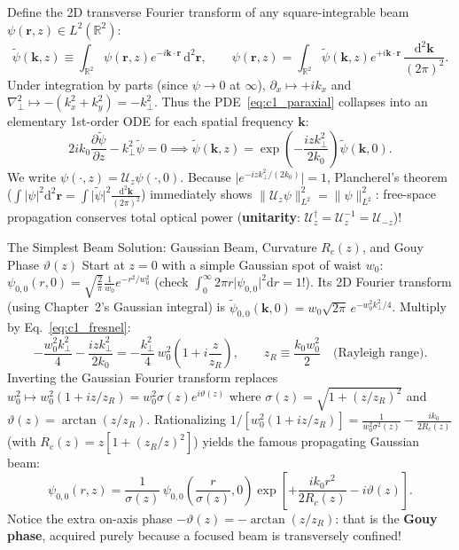 \documentclass[10pt,letterpaper]{article}
\newcommand{\norm}[1]{\lVert #1 \rVert}
\newcommand{\abs}[1]{\lvert #1 \rvert}
\newcommand{\dd}{\mathrm{d}}
\numberwithin{equation}{section}
\begin{document}
Define the 2D transverse Fourier transform of any square-integrable beam $\psi(\mathbf{r},z) \in L^2(\mathbb{R}^2)$:
\begin{equation}
  \widetilde{\psi}(\mathbf{k},z) \equiv \int_{\mathbb{R}^2} \psi(\mathbf{r},z) e^{-i\mathbf{k}\cdot\mathbf{r}}\,\dd^2\mathbf{r}, \qquad
  \psi(\mathbf{r},z) = \int_{\mathbb{R}^2} \widetilde{\psi}(\mathbf{k},z) e^{+i\mathbf{k}\cdot\mathbf{r}}\,\frac{\dd^2\mathbf{k}}{(2\pi)^2}.
  \label{eq:c1_ft}
\end{equation}
Under integration by parts (since $\psi \to 0$ at $\infty$), $\partial_x \mapsto +ik_x$ and $\nabla_\perp^2 \mapsto -(k_x^2 + k_y^2) = -k_\perp^2$. Thus the PDE~\eqref{eq:c1_paraxial} collapses into an elementary 1st-order ODE for each spatial frequency $\mathbf{k}$:
\begin{equation}
  2ik_0\frac{\partial\widetilde{\psi}}{\partial z} - k_\perp^2\widetilde{\psi} = 0
  \implies \widetilde{\psi}(\mathbf{k},z) = \exp\!\left(-\frac{iz k_\perp^2}{2k_0}\right)\widetilde{\psi}(\mathbf{k},0).
  \label{eq:c1_fresnel}
\end{equation}
We write $\psi(\cdot, z) = \mathcal{U}_z\psi(\cdot, 0)$. Because $\abs{e^{-iz k_\perp^2/(2k_0)}} = 1$, Plancherel's theorem ($\int\abs{\psi}^2\dd^2\mathbf{r} = \int\abs{\widetilde{\psi}}^2\frac{\dd^2\mathbf{k}}{(2\pi)^2}$) immediately shows $\norm{\mathcal{U}_z\psi}_{L^2}^2 = \norm{\psi}_{L^2}^2$: free-space propagation conserves total optical power (\textbf{unitarity}: $\mathcal{U}_z^\dagger = \mathcal{U}_z^{-1} = \mathcal{U}_{-z}$)!

\begin{foundationbox}{The Simplest Beam Solution: Gaussian Beam, Curvature $R_c(z)$, and Gouy Phase $\vartheta(z)$}
Start at $z = 0$ with a simple Gaussian spot of waist $w_0$: $\psi_{0,0}(r,0) = \sqrt{\frac{2}{\pi}}\frac{1}{w_0} e^{-r^2/w_0^2}$ (check $\int_0^\infty 2\pi r\abs{\psi_{0,0}}^2\dd r = 1$!). Its 2D Fourier transform (using Chapter~2's Gaussian integral) is $\widetilde{\psi}_{0,0}(\mathbf{k},0) = w_0\sqrt{2\pi}\,e^{-w_0^2 k_\perp^2/4}$. Multiply by Eq.~\eqref{eq:c1_fresnel}:
\[
  -\frac{w_0^2 k_\perp^2}{4} - \frac{iz k_\perp^2}{2k_0} = -\frac{k_\perp^2}{4}\,w_0^2\!\left(1 + i\frac{z}{z_R}\right), \qquad z_R \equiv \frac{k_0 w_0^2}{2}\quad\text{(Rayleigh range)}.
\]
Inverting the Gaussian Fourier transform replaces $w_0^2 \mapsto w_0^2(1 + iz/z_R) = w_0^2\sigma(z)e^{i\vartheta(z)}$ where $\sigma(z) = \sqrt{1+(z/z_R)^2}$ and $\vartheta(z) = \arctan(z/z_R)$. Rationalizing $1/[w_0^2(1+iz/z_R)] = \frac{1}{w_0^2\sigma^2(z)} - \frac{ik_0}{2R_c(z)}$ (with $R_c(z) = z[1+(z_R/z)^2]$) yields the famous propagating Gaussian beam:
\[
  \psi_{0,0}(r,z) = \frac{1}{\sigma(z)}\,\psi_{0,0}\!\left(\frac{r}{\sigma(z)},0\right)\exp\!\left[+\frac{ik_0 r^2}{2R_c(z)} - i\vartheta(z)\right].
\]
Notice the extra on-axis phase $-\vartheta(z) = -\arctan(z/z_R)$: that is the \textbf{Gouy phase}, acquired purely because a focused beam is transversely confined!
\end{foundationbox}
\end{document}
